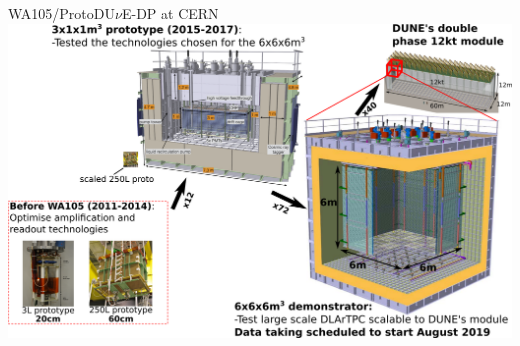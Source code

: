 \documentclass[10pt]{beamer}
\begin{document}
    \begin{frame}{WA105/\texorpdfstring{ProtoDU$\nu$E}{ProtoDUNE}-DP at CERN}
    	\vspace{0.5cm}\hspace{-0.7cm}\includegraphics[width=1.05\linewidth]{figures/contexte/wa105_scale.png}
    \end{frame}
\end{document}
